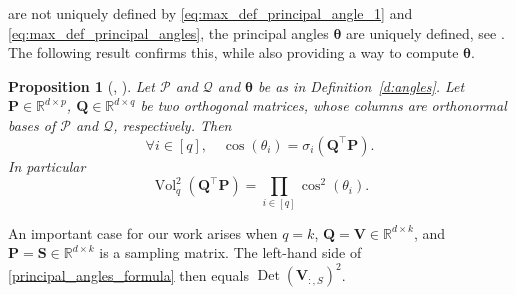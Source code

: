 \documentclass[twoside,11pt]{book}
\newtheorem{proposition}{Proposition}
\newtheorem{example}{Example}
\numberwithin{theorem}{chapter}
\numberwithin{definition}{chapter}
\numberwithin{proposition}{chapter}
\numberwithin{corollary}{chapter}
\numberwithin{example}{chapter}
\numberwithin{lemma}{chapter}
\DeclareMathOperator{\Det}{Det}
\DeclareMathOperator{\Vol}{Vol}
\DeclareMathOperator{\Tran}{\intercal}
\newcommand{\ab}[1]{\textcolor{red}{#1}}
\begin{document}
are not uniquely defined by \eqref{eq:max_def_principal_angle_1} and \eqref{eq:max_def_principal_angles}, the principal angles $\bm{\theta}$ are uniquely defined, see \citep{BjGo73}. The following result confirms this, while also providing a way to compute $\bm{\theta}$.
\begin{proposition}[\citealp{BjGo73}, \citealp{Ben92}]
  \label{principal_angles_theorem_1}
Let $\mathcal{P}$ and $\mathcal{Q}$ and $\bm{\theta}$ be as in Definition~\ref{d:angles}. Let $\bm{P} \in \mathbb{R}^{d \times p}$, $\bm{Q} \in \mathbb{R}^{d \times q}$ be two orthogonal matrices, whose columns are orthonormal bases of $\mathcal{P}$ and $\mathcal{Q}$, respectively. Then
\begin{equation}
 \forall i \in [q], \quad \cos(\theta_{i}) =\sigma_i(\bm{Q}^{\Tran}\bm{P}).
\end{equation}
In particular
\begin{equation}\label{principal_angles_formula}
\Vol_{q}^{2}(\bm{Q}^{\Tran}\bm{P}) = \prod\limits_{i \in [q]} \cos^{2}(\theta_{i}).
\end{equation}
\end{proposition}
An important case for our work arises when $q=k$, $\bm{Q}=\bm{V} \in \mathbb{R}^{d \times k}$, and $\bm{P}=\bm{S}\in \mathbb{R}^{d \times k}$ is a sampling matrix. The left-hand side of \eqref{principal_angles_formula} then equals $\Det(\bm{V}_{:,S})^2$.

\end{document}

